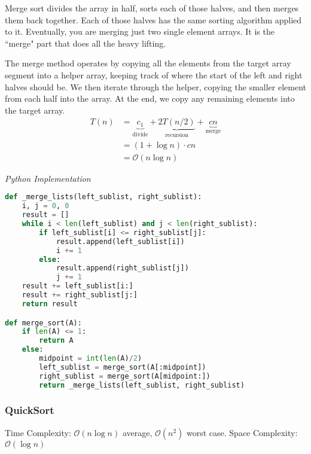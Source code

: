 \documentclass{article}
\newcommand{\bigO}{\ensuremath{\mathcal{O}}}
\begin{document}
    Merge sort divides the array in half, sorts each of those halves, and then merges them back together. Each of those halves has the same sorting algorithm applied to it. Eventually, you are merging just two single element arrays. It is the ``merge" part that does all the heavy lifting.
    
    The merge method operates by copying all the elements from the target array segment into a helper array, keeping track of where the start of the left and right halves should be. We then iterate through the helper, copying the smaller element from each half into the array. At the end, we copy any remaining elements into the target array.
    \begin{align*}
        T(n) &= 
            \underbrace{c_1}_\text{divide}
            + \underbrace{2T(n/2)}_\text{recursion}
            + \underbrace{c  n}_\text{merge}\\
        &= (1 + \log n) \cdot cn\\
        &= \bigO(n \log n)
    \end{align*}
    

\vspace{8pt} \emph{Python Implementation}
\begin{lstlisting}[language=Python]
def _merge_lists(left_sublist, right_sublist):
    i, j = 0, 0
    result = []
    while i < len(left_sublist) and j < len(right_sublist):
        if left_sublist[i] <= right_sublist[j]:
            result.append(left_sublist[i])
            i += 1
        else:
            result.append(right_sublist[j])
            j += 1
    result += left_sublist[i:]
    result += right_sublist[j:]
    return result

def merge_sort(A):
    if len(A) <= 1:
        return A
    else:
        midpoint = int(len(A)/2)
        left_sublist = merge_sort(A[:midpoint])
        right_sublist = merge_sort(A[midpoint:])
        return _merge_lists(left_sublist, right_sublist)
\end{lstlisting}
    
    \subsubsection{QuickSort}
     Time Complexity: $\bigO (n \log n)$ average, $\bigO (n^2)$ worst case. Space Complexity: $\bigO (\log n )$
     
\end{document}
